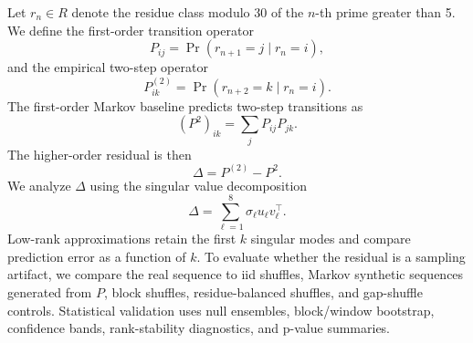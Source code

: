 Let \(r_n\in R\) denote the residue class modulo 30 of the \(n\)-th prime greater than 5. We define the first-order transition operator
\[
P_{ij}=\Pr(r_{n+1}=j\mid r_n=i),
\]
and the empirical two-step operator
\[
P^{(2)}_{ik}=\Pr(r_{n+2}=k\mid r_n=i).
\]
The first-order Markov baseline predicts two-step transitions as
\[
(P^2)_{ik}=\sum_j P_{ij}P_{jk}.
\]
The higher-order residual is then
\[
\Delta=P^{(2)}-P^2.
\]
We analyze \(\Delta\) using the singular value decomposition
\[
\Delta=\sum_{\ell=1}^{8}\sigma_\ell u_\ell v_\ell^\top.
\]
Low-rank approximations retain the first \(k\) singular modes and compare prediction error as a function of \(k\). To evaluate whether the residual is a sampling artifact, we compare the real sequence to iid shuffles, Markov synthetic sequences generated from \(P\), block shuffles, residue-balanced shuffles, and gap-shuffle controls. Statistical validation uses null ensembles, block/window bootstrap, confidence bands, rank-stability diagnostics, and p-value summaries.
